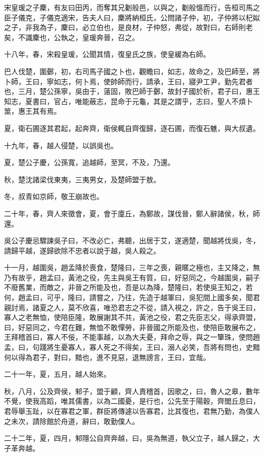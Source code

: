 \begin{pinyinscope}
宋皇瑗之子麇，有友曰田丙，而奪其兄劖般邑，以與之，劖般慍而行，告桓司馬之臣子儀克，子儀克適宋，告夫人曰，麇將納桓氏，公問諸子仲，初，子仲將以杞姒之子，非我為子，麇曰，必立伯也，是良材，子仲怒，弗從，故對曰，右師則老矣，不識麇也，公執之，皇瑗奔晉，召之。

十八年，春，宋殺皇瑗，公聞其情，復皇氏之族，使皇緩為右師。

巴人伐楚，圍鄾，初，右司馬子國之卜也，觀瞻曰，如志，故命之，及巴師至，將卜師，王曰，寧如志，何卜焉，使帥師而行，請承，王曰，寢尹工尹，勤先君者也，三月，楚公孫寧，吳由于，薳固，敗巴師于鄾，故封子國於析，君子曰，惠王知志，夏書曰，官占，唯能蔽志，昆命于元龜，其是之謂乎，志曰，聖人不煩卜筮，惠王其有焉。

夏，衛石圃逐其君起，起奔齊，衛侯輒自齊復歸，逐石圃，而復石魋，與大叔遺。

十九年，春，越人侵楚，以誤吳也。

夏，楚公子慶，公孫寬，追越師，至冥，不及，乃還。

秋，楚沈諸梁伐東夷，三夷男女，及楚師盟于敖。

冬，叔青如京師，敬王崩故也。

二十年，春，齊人來徵會，夏，會于廩丘，為鄭故，謀伐晉，鄭人辭諸侯，秋，師還。

吳公子慶忌驟諫吳子曰，不改必亡，弗聽，出居于艾，遂適楚，聞越將伐吳，冬，請歸平越，遂歸欲除不忠者以說于越，吳人殺之。

十一月，越圍吳，趙孟降於喪食，楚隆曰，三年之喪，親暱之極也，主又降之，無乃有故乎，趙孟曰，黃池之役，先主與吳王有質，曰，好惡同之，今越圍吳，嗣子不廢舊業，而敵之，非晉之所能及也，吾是以為降，楚隆曰，若使吳王知之，若何，趙孟曰，可乎，隆曰，請嘗之，乃往，先造于越軍曰，吳犯間上國多矣，聞君親討焉，諸夏之人，莫不欣喜，唯恐君志之不從，請入視之，許之，告于吳王曰，寡人之老無恤，使陪臣隆，敢展謝其不共，黃池之役，君之先臣志父，得承齊盟，曰，好惡同之，今君在難，無恤不敢憚勞，非晉國之所能及也，使陪臣敢展布之，王拜稽首曰，寡人不佞，不能事越，以為大夫憂，拜命之辱，與之一簞珠，使問趙孟，曰，句踐將生憂寡人，寡人死之不得矣，王曰，溺人必笑，吾將有問也，史黯何以得為君子，對曰，黯也，進不見惡，退無謗言，王曰，宜哉。

二十一年，夏，五月，越人始來。

秋，八月，公及齊侯，邾子，盟于顧，齊人責稽首，因歌之，曰，魯人之皋，數年不覺，使我高蹈，唯其儒書，以為二國憂，是行也，公先至于陽穀，齊閭丘息曰，君辱舉玉趾，以在寡君之軍，群臣將傳遽以告寡君，比其復也，君無乃勤，為僕人之未次，請除館於舟道，辭曰，敢勤僕人。

二十二年，夏，四月，邾隱公自齊奔越，曰，吳為無道，執父立子，越人歸之，大子革奔越。


\end{pinyinscope}
